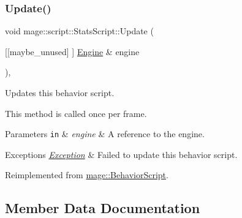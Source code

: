 \mbox{\label{classmage_1_1script_1_1_stats_script_aad8c3b8fb846d47605b1f1d14f1ea157}} 
\subsubsection{\texorpdfstring{Update()}{Update()}}
{\footnotesize\ttfamily void mage\+::script\+::\+Stats\+Script\+::\+Update (\begin{DoxyParamCaption}\item[{\mbox{[}\mbox{[}maybe\+\_\+unused\mbox{]} \mbox{]} \mbox{\hyperlink{classmage_1_1_engine}{Engine}} \&}]{engine }\end{DoxyParamCaption})\hspace{0.3cm}{\ttfamily [override]}, {\ttfamily [virtual]}}

Updates this behavior script.

This method is called once per frame.


\begin{DoxyParams}[1]{Parameters}
\mbox{\tt in}  & {\em engine} & A reference to the engine. \\
\hline
\end{DoxyParams}

\begin{DoxyExceptions}{Exceptions}
{\em \mbox{\hyperlink{classmage_1_1_exception}{Exception}}} & Failed to update this behavior script. \\
\hline
\end{DoxyExceptions}


Reimplemented from \mbox{\hyperlink{classmage_1_1_behavior_script_a085634661326b59850c1111e537baa4e}{mage\+::\+Behavior\+Script}}.



\subsection{Member Data Documentation}
\mbox{\label{classmage_1_1script_1_1_stats_script_a7ef910aceb585af53110697ea5b3f810}} 

